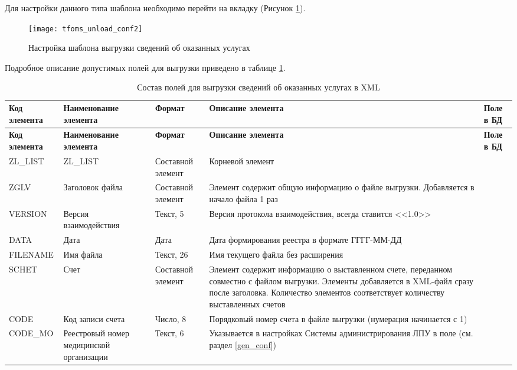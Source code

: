 Для настройки данного типа шаблона необходимо перейти на вкладку  (Рисунок \ref{img_tfoms_unload_conf2}).

\begin{figure}[ht]\centering
 \texttt{[image: tfoms\_unload\_conf2]}
 \caption{Настройка шаблона выгрузки сведений об оказанных услугах}
 \label{img_tfoms_unload_conf2}
\end{figure}

Подробное описание допустимых полей для выгрузки приведено в таблице \ref{tbl_tfoms_srv_xml}.

{\small
\begin{longtable}{|p{2.2cm}|p{2.6cm}|p{2cm}|p{5.2cm}|p{4cm}|}
\caption{Состав полей для выгрузки сведений об оказанных услугах в XML \label{tbl_tfoms_srv_xml}}\\
\hline \rule{0pt}{15pt} \centering \textbf{Код элемента} & \centering \textbf{Наимено\-ва\-ние элемента} & \centering \textbf{Формат}  & \centering \textbf{Описание элемента} & \hfil \textbf{Поле в БД} \\ \hline
\endfirsthead
\hline \rule{0pt}{15pt} \centering \textbf{Код элемента} & \centering \textbf{Наимено\-ва\-ние элемента} & \centering \textbf{Формат}  & \centering \textbf{Описание элемента} & \hfil \textbf{Поле в БД} \\ \hline
\endhead
ZL\_LIST &	ZL\_LIST &	Составной элемент	& Корневой элемент  &  \\ \hline	
ZGLV &	Заголовок файла	& Составной элемент &	Элемент содержит общую информацию о файле выгрузки. Добавляется в начало файла 1 раз	&  \\ \hline
VERSION	& Версия взаимодействия	& Текст, 5 & 	Версия протокола взаимодействия, всегда ставится <<1.0>> &  \\ \hline	
DATA	& Дата	& Дата	& Дата формирования реестра в формате ГГГГ-ММ-ДД &  \\ \hline	
FILENAME	& Имя файла	& Текст, 26	& Имя текущего файла без расширения	&  \\ \hline
SCHET	& Счет	& Составной элемент	& Элемент содержит информацию о выставленном счете, переданном совместно с файлом выгрузки. Элементы добавляется в XML-файл сразу после заголовка. Количество элементов соответствует количеству выставленных счетов &  \\ \hline	
CODE	& Код записи счета	& Число, 8	& Порядковый номер счета в файле выгрузки (нумерация начинается с 1) &  \\ \hline	
CODE\_MO	& Реестровый номер медицинской организации	& Текст, 6 & 	Указывается в настройках Системы администрирования ЛПУ в поле \dm{ИНФИС код ЛПУ} (см. раздел \ref{gen_conf}) &  \\ \hline

\end{longtable}}
